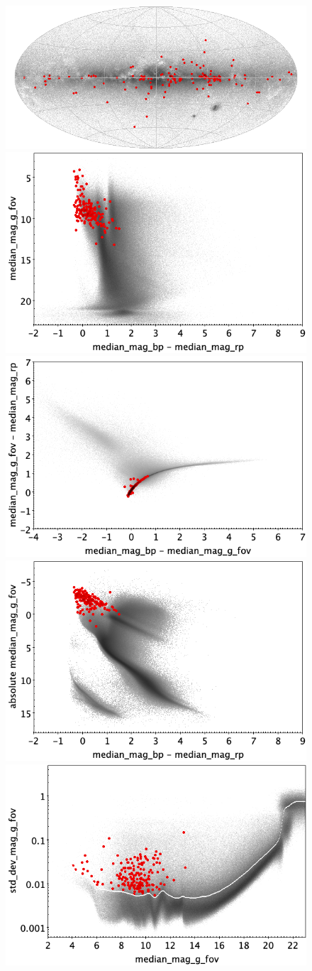 \documentclass[longauth]{aa}
\begin{document}
\begin{appendix}
\begin{figure}
\centering
{} \includegraphics[width=0.6\hsize]{figures/appendix/BCEP_trn_sky.png} \\ %
\vspace{4mm}
 \includegraphics[width=0.45\hsize]{figures/appendix/BCEP_trn_cm.png}  %
\hspace{2mm}
 \includegraphics[width=0.45\hsize]{figures/appendix/BCEP_trn_cc.png} \\ %
\vspace{4mm}
 \includegraphics[width=0.45\hsize]{figures/appendix/BCEP_trn_cam.png}  %
\hspace{2mm}
 \includegraphics[width=0.45\hsize]{figures/appendix/BCEP_trn_msd.png} \\ %

\end{figure}
\end{appendix}
\end{document}
